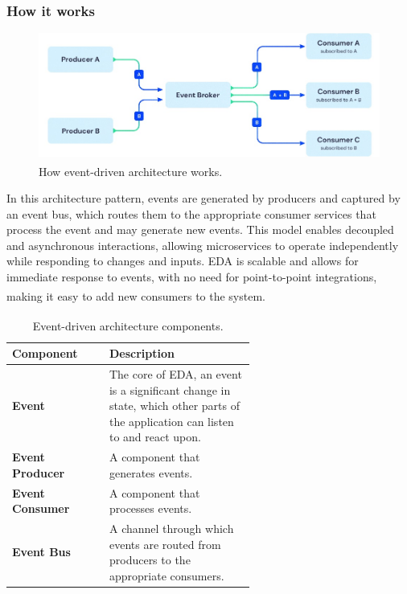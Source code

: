 \newpage

\subsubsection{How it works}

\begin{figure}
    \centering
    \includegraphics[scale=0.6]{Pictures/3_event_works.jpg}
    \caption{How event-driven architecture works\textsuperscript{\cite{event_4}}.}
    \label{fig:3_event_works}
\end{figure}

In this architecture pattern, events are generated by producers and captured by an event bus,
which routes them to the appropriate consumer services that process the event and may generate new
events. This model enables decoupled and asynchronous interactions, allowing microservices to
operate independently while responding to changes and inputs. EDA is scalable and allows for
immediate response to events, with no need for point-to-point integrations, making it easy to add
new consumers to the system\textsuperscript{\cite{event_3}}.

\begin{table}
    \centering
    \begin{tabular}{|l|p{0.6\linewidth}|}
        \hline
        \textbf{Component}      & \textbf{Description}                                                    \\ \hline
        \textbf{Event}          & The core of EDA, an event is a significant change in state, which other
        parts of the application can listen to and react upon.                                            \\ \hline
        \textbf{Event Producer} & A component that generates events.                                      \\ \hline
        \textbf{Event Consumer} & A component that processes events.                                      \\ \hline
        \textbf{Event Bus}      & A channel through which events are routed from producers to the
        appropriate consumers.                                                                            \\ \hline
    \end{tabular}
    \caption{Event-driven architecture components\textsuperscript{\cite{event_3}}.}
    \label{tab:eda_components}
\end{table}

